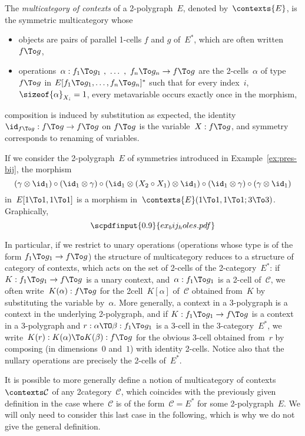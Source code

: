 \documentclass{LMCS}
\newcommand{\strid}[1]{\scpdfinput{0.9}{#1.pdf}}
\newenvironment{definition}{\begin{defi}}{\end{defi}}
\newenvironment{example}{\begin{exa}}{\end{exa}}
\renewcommand{\C}{\mathcal{C}}
\begin{document}
\begin{definition}
  \label{def:context-multicat}
  The \emph{multicategory of contexts} of a 2-polygraph~$E$, denoted
  by~$\contexts{E}$, is the symmetric multicategory whose
  \begin{itemize}
  \item objects are pairs of parallel 1-cells $f$ and $g$ of~$E^*$, which are
    often written~$f\To g$,
  \item operations~$\alpha:f_1\To g_1\ ,\ \ldots\ ,\ f_n\To g_n\to f\To g$ are the
    2-cells~$\alpha$ of type~$f\To g$ in $E[f_1\To g_1,\ldots,f_n\To g_n]^*$
    such that for every index~$i$, $\sizeof{\alpha}_{X_i}=1$, \ie every
    metavariable occurs exactly once in the morphism,
  \end{itemize}
  composition is induced by substitution as expected, the identity~$\id_{f\To
    g}:f\To g\to f\To g$ on $f\To g$ is the variable~$X:f\To g$, and symmetry
  corresponds to renaming of variables.
\end{definition}

\begin{example}
  If we consider the 2-polygraph~$E$ of symmetries introduced in
  Example~\ref{ex:pres-bij}, the morphism
  \[
  (\gamma\otimes\id_1)\circ(\id_1\otimes\gamma)\circ(\id_1\otimes(X_2\circ X_1)\otimes\id_1)\circ(\id_1\otimes\gamma)\circ(\gamma\otimes\id_1)
  \]
  in~$E[1\To 1,1\To 1]$ is a morphism in~$\contexts{E}(1\To 1,1\To 1;3\To
  3)$. Graphically,
  \[
  \strid{ex_bij_holes}
  \]
\end{example}

In particular, if we restrict to unary operations (operations whose type is of
the form $f_1\To g_1\to f\To g$) the structure of multicategory reduces to a
structure of category of contexts, which acts on the set of 2-cells of the
2-category~$E^*$: if~$K:f_1\To g_1\to f\To g$ is a unary context,
and~$\alpha:f_1\To g_1$ is a 2-cell of~$\C$, we often write~$K(\alpha):f\To g$
for the 2\nbd{}cell~$K[\alpha]$ of~$\C$ obtained from~$K$ by substituting the
variable by~$\alpha$. More generally, a context in a 3-polygraph is a context in
the underlying 2-polygraph, and if $K:f_1\To g_1\to f\To g$ is a context in a
3-polygraph and $r:\alpha\TO\beta:f_1\To g_1$ is a 3-cell in the
3-category~$E^*$, we write~$K(r):K(\alpha)\To K(\beta):f\To g$ for the obvious
3-cell obtained from~$r$ by composing (in dimensions~$0$ and~$1$) with identity
2-cells. Notice also that the nullary operations are precisely the 2-cells
of~$E^*$.

It is possible to more generally define a notion of multicategory of
contexts~$\contexts\C$ of any 2\nbd{}category~$\C$, which coincides with the
previously given definition in the case where~$\C$ is of the form~$\C=E^*$ for
some 2-polygraph~$E$. We will only need to consider this last case in the
following, which is why we do not give the general definition.
\end{document}
